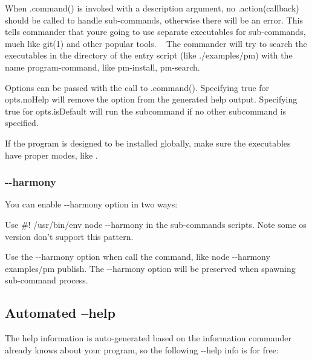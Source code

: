When {\ttfamily .command()} is invoked with a description argument, no {\ttfamily .action(callback)} should be called to handle sub-\/commands, otherwise there will be an error. This tells commander that you\textquotesingle{}re going to use separate executables for sub-\/commands, much like {\ttfamily git(1)} and other popular tools. ~\newline
The commander will try to search the executables in the directory of the entry script (like {\ttfamily ./examples/pm}) with the name {\ttfamily program-\/command}, like {\ttfamily pm-\/install}, {\ttfamily pm-\/search}.

Options can be passed with the call to {\ttfamily .command()}. Specifying {\ttfamily true} for {\ttfamily opts.\+no\+Help} will remove the option from the generated help output. Specifying {\ttfamily true} for {\ttfamily opts.\+is\+Default} will run the subcommand if no other subcommand is specified.

If the program is designed to be installed globally, make sure the executables have proper modes, like {}.

\subsubsection*{{\ttfamily -\/-\/harmony}}

You can enable {\ttfamily -\/-\/harmony} option in two ways\+:
\begin{DoxyItemize}
\item Use {\ttfamily \#! /usr/bin/env node -\/-\/harmony} in the sub-\/commands scripts. Note some os version don’t support this pattern.
\item Use the {\ttfamily -\/-\/harmony} option when call the command, like {\ttfamily node -\/-\/harmony examples/pm publish}. The {\ttfamily -\/-\/harmony} option will be preserved when spawning sub-\/command process.
\end{DoxyItemize}

\subsection*{Automated --help}

The help information is auto-\/generated based on the information commander already knows about your program, so the following {\ttfamily -\/-\/help} info is for free\+:




